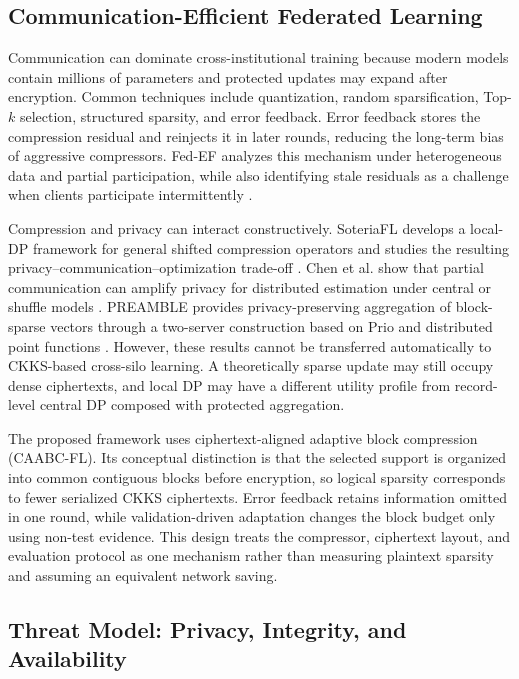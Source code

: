 \subsection{Communication-Efficient Federated Learning}

Communication can dominate cross-institutional training because modern models contain millions of parameters and protected updates may expand after encryption. Common techniques include quantization, random sparsification, Top-$k$ selection, structured sparsity, and error feedback. Error feedback stores the compression residual and reinjects it in later rounds, reducing the long-term bias of aggressive compressors. Fed-EF analyzes this mechanism under heterogeneous data and partial participation, while also identifying stale residuals as a challenge when clients participate intermittently \cite{li2023fedef}.

Compression and privacy can interact constructively. SoteriaFL develops a local-DP framework for general shifted compression operators and studies the resulting privacy--communication--optimization trade-off \cite{li2022soteriafl}. Chen et al. show that partial communication can amplify privacy for distributed estimation under central or shuffle models \cite{chen2023privacycompression}. PREAMBLE provides privacy-preserving aggregation of block-sparse vectors through a two-server construction based on Prio and distributed point functions \cite{asi2025preamble}. However, these results cannot be transferred automatically to CKKS-based cross-silo learning. A theoretically sparse update may still occupy dense ciphertexts, and local DP may have a different utility profile from record-level central DP composed with protected aggregation.

The proposed framework uses ciphertext-aligned adaptive block compression (CAABC-FL). Its conceptual distinction is that the selected support is organized into common contiguous blocks before encryption, so logical sparsity corresponds to fewer serialized CKKS ciphertexts. Error feedback retains information omitted in one round, while validation-driven adaptation changes the block budget only using non-test evidence. This design treats the compressor, ciphertext layout, and evaluation protocol as one mechanism rather than measuring plaintext sparsity and assuming an equivalent network saving.

\subsection{Threat Model: Privacy, Integrity, and Availability}

